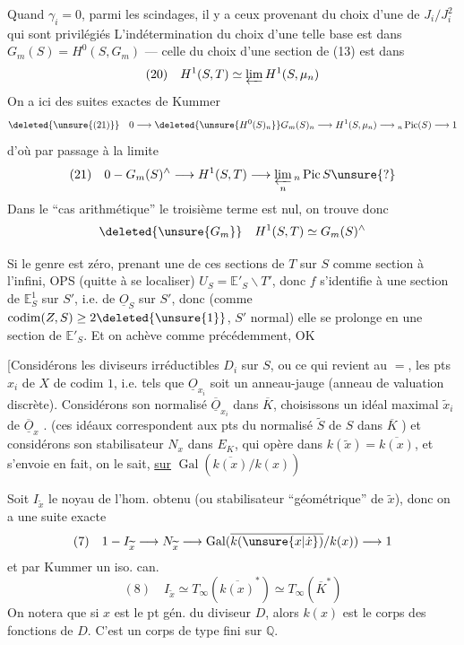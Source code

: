 Quand $\gamma_i=0$, parmi les scindages, il y a ceux provenant du choix d'une  de $J_i/J_i^2$ qui sont privilégiés L'indétermination du choix d'une telle base est dans $G_m(S)=H^0(S,G_m)$ --- celle du choix d'une section de (13) est dans
\[
(20)\quad H^1(S,T)\simeq\varprojlim H^1(S,\mu_n)
\]
On a ici des suites exactes de Kummer
\[
\deleted{\unsure{(21)}}\quad 0\longrightarrow\deleted{\unsure{H^0(S)_n}}G_m(S)_n\longrightarrow H^1(S,\mu_n)\longrightarrow{}_n\operatorname{Pic}(S)\longrightarrow1
\]
d'où par passage à la limite
\[
(21)\quad 0-G_m(S)^\wedge\longrightarrow H^1(S,T)\longrightarrow\varprojlim_n{}_n\operatorname{Pic}S\unsure{?}
\]
Dans le ``cas arithmétique'' le troisième terme est nul, on trouve donc
\[
\deleted{\unsure{G_m}}\quad H^1(S,T)\simeq G_m(S)^\wedge
\]

Si le genre est zéro, prenant une de ces sections de $T$ sur $S$ comme section à l'infini, OPS (quitte à se localiser) $U_S=\mathbb E'_S\smallsetminus T'$, donc $f$ s'identifie à une section de $\mathbb E^1_S$ sur $S'$, i.e. de $\underline O_S$ sur $S'$, donc (comme $\operatorname{codim}(Z,S)\geq2\deleted{\unsure{1}}$, $S'$ normal) elle se prolonge en une section de $\mathbb E'_S$. Et on achève comme précédemment, OK

[Considérons  les diviseurs irréductibles $D_i$ sur $S$, ou ce qui revient au $=$, les pts $x_i$ de $X$ de codim $1$, i.e. tels que $\underline O_{x_i}$ soit un anneau-jauge (anneau de valuation discrète). Considérons son normalisé $\overline{\underline O}_{x_i}$ dans $\overline K$, choisissons un idéal maximal $\widetilde x_i$ de $\overline{\underline O}_x$ . (ces idéaux correspondent aux pts du normalisé $\widetilde S$ de $S$ dans $\overline K$ ) et considérons son stabilisateur $N_x$ dans  $E_K$, qui opère  dans $k(\widetilde x)=\overline{k(x)}$, et s'envoie en fait, on le sait, \uline{sur} $\operatorname{Gal}(\overline{k(x)}/k(x))$

Soit $I_{\widetilde x}$ le noyau de l'hom. obtenu
(ou stabilisateur ``géométrique'' de $\widetilde x$), donc
on a une suite exacte
\[
(7)\quad 1-I_{\widetilde x}\longrightarrow N_{\widetilde x}\longrightarrow\operatorname{Gal}(\overline{k(\unsure{x|\dot{x}})}/k(x))\longrightarrow1
\]
et par Kummer un iso. can.
\[
(8)\quad I_{\widetilde x}\simeq T_\infty(\overline{k(x)}^*)\simeq T_\infty(\overline K^*)
\]
On notera que si $x$ est le pt gén. du
diviseur $D$, alors $k(x)$ est le corps des
fonctions de $D$. C'est un corps de
type fini sur $\mathbb Q$.

